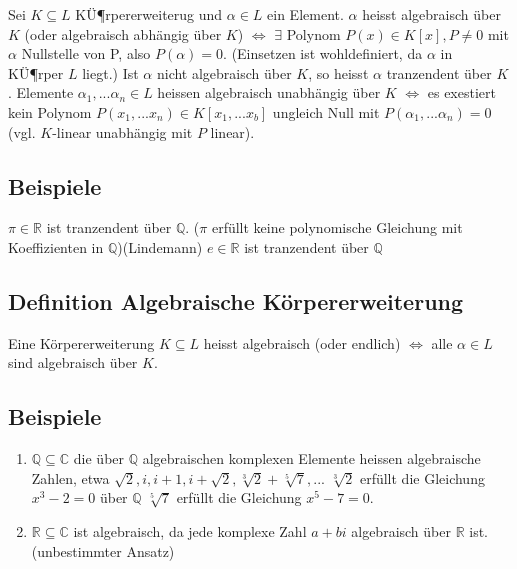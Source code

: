 \documentclass[12pt,a4paper,ngerman]{scrreprt}
\begin{document}
Sei $K \subseteq L $ KÜ¶rpererweiterug und $\alpha \in L$ ein Element.
$\alpha$ heisst algebraisch über $K$ (oder algebraisch abhängig über $K$)
$\Leftrightarrow$ $\exists$ Polynom $P(x) \in K[x], P \neq 0$ mit $\alpha$ Nullstelle von P,
also $P(\alpha) = 0$. (Einsetzen ist wohldefiniert, da $\alpha$ in KÜ¶rper $L$ liegt.)
Ist $\alpha$ nicht algebraisch über $K$, so heisst $\alpha$ tranzendent über $K$.
Elemente $\alpha_1, ... \alpha_n \in L$ heissen algebraisch unabhängig über $K$ 
$\Leftrightarrow$ es exestiert kein Polynom $P(x_1, ... x_n) \in K[x_1, ... x_b]$
ungleich Null mit $P(\alpha_1, ... \alpha_n) = 0$ (vgl. $K$-linear unabhängig mit $P$ linear).

\subsection{Beispiele}
$\pi \in \mathbb{R}$ ist tranzendent über $\mathbb{Q}$.
($\pi$ erfüllt keine polynomische Gleichung mit Koeffizienten in $\mathbb{Q}$)(Lindemann)
$e \in \mathbb{R}$ ist tranzendent über $\mathbb{Q}$

\subsection{Definition Algebraische Körpererweiterung}
Eine Körpererweiterung $K \subseteq L$ heisst algebraisch (oder endlich)
$\Leftrightarrow$ alle $\alpha \in L$ sind algebraisch über $K$.

\subsection{Beispiele}
\begin{enumerate}[(1)]
\item $\mathbb{Q} \subseteq \mathbb{C}$ die über $\mathbb{Q}$ algebraischen komplexen Elemente heissen algebraische Zahlen,
etwa $\sqrt{2}, i, i+1, i+\sqrt{2}, \sqrt[3]{2} + \sqrt[5]{7}, ...$ $\sqrt[3]{2}$ erfüllt die Gleichung $x^3 -2 = 0$ über $\mathbb{Q}$
$\sqrt[5]{7}$ erfüllt die Gleichung $x^5 -7 = 0$.
\item $\mathbb{R} \subseteq \mathbb{C}$ ist algebraisch, da jede komplexe Zahl $a+bi$ algebraisch über $\mathbb{R}$ ist. (unbestimmter Ansatz)
\end{enumerate}
\end{document}
